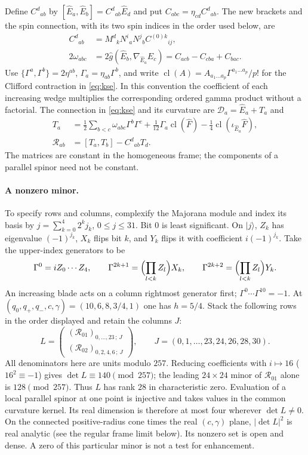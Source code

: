 Define $C^d{}_{ab}$ by $[\widehat E_a,\widehat E_b]=C^d{}_{ab}\widehat E_d$
and put $C_{abc}=\eta_{cd}C^d{}_{ab}$. The new brackets and the spin
connection, with its two spin indices in the order used below, are
\begin{align*}
 C^d{}_{ab}&=M^d{}_k N^i{}_a N^j{}_b C^{(0)k}{}_{ij},\\
 2\omega_{abc}&=2\hat g(\widehat E_b,\nabla_{\widehat E_a}\widehat E_c)
             =C_{acb}-C_{cba}+C_{bac} .
\end{align*}
Use $\{\Gamma^a,\Gamma^b\}=2\eta^{ab}$, $\Gamma_a=\eta_{ab}\Gamma^b$, and
write $\operatorname{cl}(A)=A_{a_1\ldots a_p}\Gamma^{a_1\ldots a_p}/p!$
for the Clifford contraction in \eqref{eq:kse}. In this convention
the coefficient of each increasing wedge multiplies the corresponding
ordered gamma product without a factorial. The connection in \eqref{eq:kse}
and its curvature are $\mathcal D_a=\widehat E_a+T_a$ and
\begin{align*}
 T_a&=\tfrac12\sum_{b<c}\omega_{abc}\Gamma^b\Gamma^c
       +\tfrac1{12}\Gamma_a\operatorname{cl}(\hat F)
       -\tfrac14\operatorname{cl}(\iota_{\widehat E_a}\hat F),\\
 \mathcal R_{ab}&=[T_a,T_b]-C^d{}_{ab}T_d .
\end{align*}
The matrices are constant in the homogeneous frame; the components of a
parallel spinor need not be constant.

\paragraph{A nonzero minor.}
To specify rows and columns, complexify the Majorana module and index its
basis by $j=\sum_{k=0}^4 2^k j_k$, $0\le j\le31$. Bit $0$ is least
significant. On $|j\rangle$, $Z_k$ has eigenvalue $(-1)^{j_k}$, $X_k$
flips bit $k$, and $Y_k$ flips it with coefficient $i(-1)^{j_k}$.
Take the upper-index generators to be
\[
 \Gamma^0=i Z_0\cdots Z_4,\qquad
 \Gamma^{2k+1}=\Bigl(\prod_{l<k}Z_l\Bigr)X_k,\qquad
 \Gamma^{2k+2}=\Bigl(\prod_{l<k}Z_l\Bigr)Y_k .
\]
An increasing blade acts on a column rightmost generator first;
$\Gamma^0\cdots\Gamma^{10}=-1$. At
$(q_0,q_+,q_-,c,\gamma)=(10,6,8,3/4,1)$ one has $h=5/4$. Stack the
following rows in the order displayed and retain the columns $J$:
\[
 L=\begin{pmatrix}
       (\mathcal R_{01})_{0,\ldots,23\,;\,J}\\
       (\mathcal R_{02})_{0,2,4,6\,;\,J}
    \end{pmatrix},\qquad J=(0,1,\ldots,23,24,26,28,30).
\]
All denominators here are units modulo $257$. Reducing coefficients with
$i\mapsto16$ ($16^2\equiv-1$) gives $\det L\equiv140\pmod{257}$; the
leading $24\times24$ minor of $\mathcal R_{01}$ alone is $128\pmod{257}$.
Thus $L$ has rank $28$ in characteristic zero. Evaluation of a local
parallel spinor at one point is injective and takes values in the common
curvature kernel. Its real dimension is therefore at most four wherever
$\det L\ne0$. On the connected positive-radius cone times the real
$(c,\gamma)$ plane, $|\det L|^2$ is real analytic (see the regular frame
limit below). Its nonzero set is open and dense. A zero of this particular
minor is not a test for enhancement.

